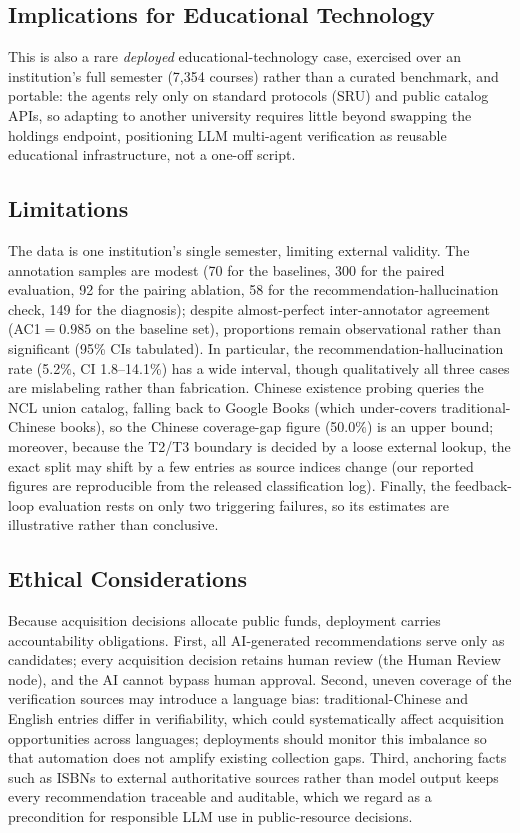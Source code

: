 \documentclass[conference]{IEEEtran}
\begin{document}
\subsection{Implications for Educational Technology}
This is also a rare \emph{deployed} educational-technology case, exercised over
an institution's full semester (7{,}354 courses) rather than a curated benchmark,
and portable: the agents rely only on standard protocols (SRU) and public
catalog APIs, so adapting to another university requires little beyond swapping
the holdings endpoint, positioning LLM multi-agent verification as reusable
educational infrastructure, not a one-off script.

\subsection{Limitations}
The data is one institution's single semester, limiting external validity. The
annotation samples are modest (70 for the baselines, 300 for the paired
evaluation, 92 for the pairing ablation, 58 for the recommendation-hallucination
check, 149 for the diagnosis); despite almost-perfect inter-annotator agreement
(AC1${}=0.985$ on the baseline set), proportions remain observational rather than
significant (95\% CIs tabulated). In particular, the recommendation-hallucination
rate (5.2\%, CI 1.8--14.1\%) has a wide interval, though qualitatively all three
cases are mislabeling rather than fabrication. Chinese existence probing queries
the NCL union catalog, falling back to Google Books (which under-covers
traditional-Chinese books), so the Chinese coverage-gap figure (50.0\%) is an
upper bound; moreover, because the T2/T3 boundary is decided by a loose external
lookup, the exact split may shift by a few entries as source indices change (our
reported figures are reproducible from the released classification log). Finally,
the feedback-loop evaluation rests on only two triggering failures, so its
estimates are illustrative rather than conclusive.

\subsection{Ethical Considerations}
Because acquisition decisions allocate public funds, deployment carries
accountability obligations. First, all AI-generated recommendations serve only
as candidates; every acquisition decision retains human review (the Human Review
node), and the AI cannot bypass human approval. Second, uneven coverage of the
verification sources may introduce a language bias: traditional-Chinese and
English entries differ in verifiability, which could systematically affect
acquisition opportunities across languages; deployments should monitor this
imbalance so that automation does not amplify existing collection gaps. Third,
anchoring facts such as ISBNs to external authoritative sources rather than model
output keeps every recommendation traceable and auditable, which we regard as a
precondition for responsible LLM use in public-resource decisions.
\end{document}

